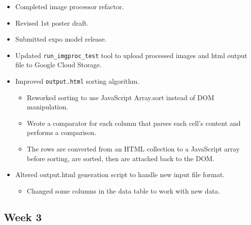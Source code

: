\documentclass[10pt, onecolumn, draftclsnofoot, letterpaper, compsoc]{IEEEtran}
\begin{document}
    \begin{itemize}

	\item Completed image processor refactor.

	\item Revised 1st poster draft.

	\item Submitted expo model release.

	\item Updated \texttt{run\_imgproc\_test} tool to upload processed images and html output file to Google Cloud Storage.

	\item Improved \texttt{output.html} sorting algorithm.

		\begin{itemize}
			\item Reworked sorting to use JavaScript Array.sort instead of DOM manipulation.
			\item Wrote a comparator for each column that parses each cell's content and performs a comparison.
			\item The rows are converted from an HTML collection to a JavaScript array before sorting, are sorted, then are attached back to the DOM.
		\end{itemize}

		\item Altered output.html generation script to handle new input file format.

		\begin{itemize}
			\item Changed some columns in the data table to work with new data.
		\end{itemize}

    \end{itemize}

\subsection{Week 3}
\end{document}

